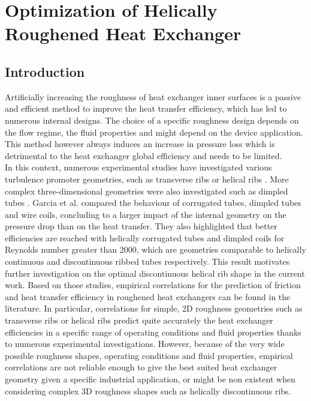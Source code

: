 \chapter{Optimization of Helically Roughened Heat Exchanger}

\section{Introduction}

Artificially increasing the roughness of heat exchanger inner surfaces is a passive and efficient method to improve the heat transfer efficiency, which has led to numerous internal designs. The choice of a specific roughness design depends on the flow regime, the fluid properties and might depend on the device application. This method however always induces an increase in pressure loss which is detrimental to the heat exchanger global efficiency and needs to be limited.\\

In this context, numerous experimental studies have investigated various turbulence promoter geometries, such as transverse ribs \cite{webb1971, aliaga1994} or helical ribs \cite{gee1980, VicenteGarciaViedma2004, cheng2006, Mayo2016}. More complex three-dimensional geometries were also investigated such as dimpled tubes \cite{VicenteGarciaViedma2002}. Garcia et al. \cite{GarciaSolanoVicenteEtAl2012} compared the behaviour of corrugated tubes, dimpled tubes and wire coils, concluding to a larger impact of the internal geometry on the pressure drop than on the heat transfer. They also highlighted that better efficiencies are reached with helically corrugated tubes and dimpled coils for Reynolds number greater than 2000, which are geometries comparable to helically continuous and discontinuous ribbed tubes respectively. This result motivates further investigation on the optimal discontinuous helical rib shape in the current work. Based on those studies, empirical correlations for the prediction of friction and heat transfer efficiency in roughened heat exchangers can be found in the literature. In particular, correlations for simple, 2D roughness geometries such as transverse ribs or helical ribs predict quite accurately the heat exchanger efficiencies in a specific range of operating conditions and fluid properties thanks to numerous experimental investigations. However, because of the very wide possible roughness shapes, operating conditions and fluid properties, empirical correlations are not reliable enough to give the best suited heat exchanger geometry given a specific industrial application, or might be non existent when considering complex 3D roughness shapes such as helically discontinuous ribs.\\

